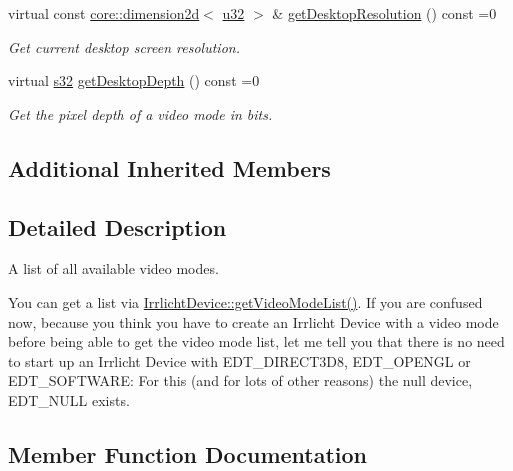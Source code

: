 \begin{DoxyCompactItemize}
virtual const \hyperlink{classirr_1_1core_1_1dimension2d}{core\+::dimension2d}$<$ \hyperlink{namespaceirr_a0416a53257075833e7002efd0a18e804}{u32} $>$ \& \hyperlink{classirr_1_1video_1_1IVideoModeList_a9234a4838ba66177afec14120273ca7a}{get\+Desktop\+Resolution} () const  =0
\begin{DoxyCompactList}\small\item\em Get current desktop screen resolution. \end{DoxyCompactList}\item 
virtual \hyperlink{namespaceirr_ac66849b7a6ed16e30ebede579f9b47c6}{s32} \hyperlink{classirr_1_1video_1_1IVideoModeList_a6cb209e8375881281f09f42435cdbf3e}{get\+Desktop\+Depth} () const  =0
\begin{DoxyCompactList}\small\item\em Get the pixel depth of a video mode in bits. \end{DoxyCompactList}\end{DoxyCompactItemize}
\subsection*{Additional Inherited Members}


\subsection{Detailed Description}
A list of all available video modes. 

You can get a list via \hyperlink{classirr_1_1IrrlichtDevice_a8872867a5ad728a4673679e9e8f469e7}{Irrlicht\+Device\+::get\+Video\+Mode\+List()}. If you are confused now, because you think you have to create an Irrlicht Device with a video mode before being able to get the video mode list, let me tell you that there is no need to start up an Irrlicht Device with E\+D\+T\+\_\+\+D\+I\+R\+E\+C\+T3\+D8, E\+D\+T\+\_\+\+O\+P\+E\+N\+GL or E\+D\+T\+\_\+\+S\+O\+F\+T\+W\+A\+RE\+: For this (and for lots of other reasons) the null device, E\+D\+T\+\_\+\+N\+U\+LL exists. 

\subsection{Member Function Documentation}
